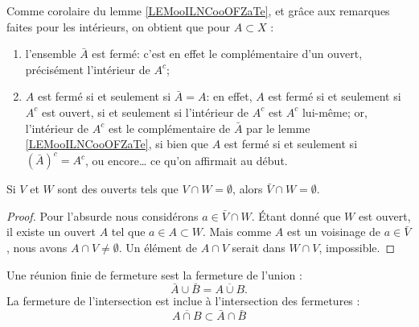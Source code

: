 \begin{remark}\label{RemAdhFerme}
	Comme corolaire du lemme \ref{LEMooILNCooOFZaTe}, et grâce aux remarques faites pour les intérieurs, on obtient que pour \( A \subset X \) :
	\begin{enumerate}
		\item l'ensemble \( \bar A \) est fermé: c'est en effet le complémentaire d'un ouvert, précisément l'intérieur de \( A^c \);
		\item \( A \) est fermé si et seulement si \( \bar A = A \): en effet, \( A \) est fermé si et seulement si \( A^c \) est ouvert, si et seulement si l'intérieur de \( A^c \) est \( A^c \) lui-même; or, l'intérieur de \( A^c \) est le complémentaire de \( \bar A \) par le lemme \ref{LEMooILNCooOFZaTe}, si bien que \( A \) est fermé si et seulement si \( (\bar A)^c  = A^c \), ou encore\dots{} ce qu'on affirmait au début.
	\end{enumerate}
\end{remark}


\begin{proposition}	\label{PROPooMDQDooBYjvXO}
	Si \( V\) et \( W\) sont des ouverts tels que \( V\cap W=\emptyset\), alors \( \bar V\cap W=\emptyset\).
\end{proposition}

\begin{proof}
	Pour l'absurde nous considérons \( a\in \bar V\cap W\). Étant donné que \( W\) est ouvert, il existe un ouvert \( A\) tel que \( a\in A\subset W\). Mais comme \( A\) est un voisinage de \( a\in\bar V\), nous avons \( A\cap V\neq\emptyset\). Un élément de \( A\cap V\) serait dans \( W\cap V\), impossible.
\end{proof}

\begin{proposition}	\label{PROPooEQYEooZHXKnL}
	Une réunion finie de fermeture sest la fermeture de l'union :
	\begin{equation}			\label{EQooSBGTooGPPbCl}
		\bar A\cup\bar B=\overline{A\cup B}.
	\end{equation}
	La fermeture de l'intersection est inclue à l'intersection des fermetures :
	\begin{equation}
		\overline{A\cap B}\subset \bar A\cap\bar B
	\end{equation}
\end{proposition}

